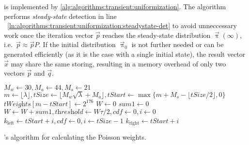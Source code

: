  is implemented by
\vref{alg:algorithms:transient:uniformization}. The algorithm performs
\emph{steady-state} detection in line%
~\ref{ln:algorithms:transient:uniformization:steadystate-det} to avoid
unneccessary work once the iteration vector $\vec{p}$ reaches the
steady-state distribution $\vec{\uppi}(\infty)$,
i.e.~$\vec{p} \approx \vec{p} P$. If the initial distribution
$\vec{\uppi}_0$ is not further needed or can be generated efficiently
(as it is the case with a single initial state), the result vector
$\vec{x}$ may share the same storing, resulting in a memory overhead
of only two vectors $\vec{p}$ and $\vec{q}$.

\begin{algorithmpage}
  $M_w \gets 30, M_a \gets 44, M_s \gets 21$
  $m \gets \lfloor \lambda \rfloor, \textit{tSize} \gets \lfloor
  M_w \sqrt{\lambda} + M_a \rfloor, \textit{tStart} \gets \max
  \{m + M_s - \lfloor \textit{tSize} / 2 \rfloor, 0 \}$\;
  \;
  $\textit{tWeights}[m - \textit{tStart}] \gets 2^{176}$\;
  $W \gets 0$\;
  $\textit{sum1} \gets 0$
  $W \gets W + \textit{sum1}, \textit{threshold} \gets W \tau / 2,
  \textit{cdf} \gets 0, i \gets 0$\;
  $k_{\text{left}} \gets \textit{tStart} + i, \textit{cdf} \gets 0, i
  \gets \textit{tSize} - 1$\;
  $k_{\text{right}} \gets \textit{tStart} + i$\;
  \;
  \;
  \caption{\citeauthor{DBLP:journals/corr/Burak14}'s algorithm for
    calculating the Poisson weights.}
  \label{alg:algorithms:transient:poisson}
\end{algorithmpage}

